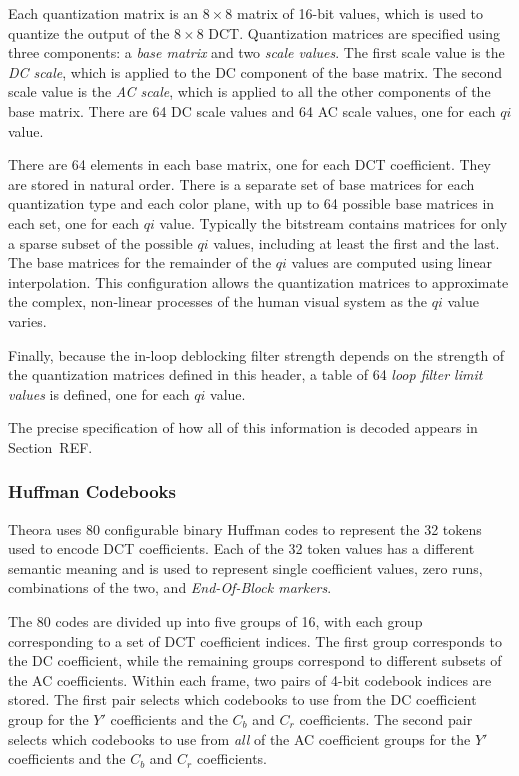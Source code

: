 \documentclass[11pt,letterpaper]{article}
\newcommand{\qi}{\ensuremath{\mathit{qi}} }
\newcommand{\term}[1]{{\em #1}}
\begin{document}
Each quantization matrix is an $8\times 8$ matrix of 16-bit values, which is
 used to quantize the output of the $8\times 8$ DCT.
Quantization matrices are specified using three components: a
 \term{base matrix} and two \term{scale values}.
The first scale value is the \term{DC scale}, which is applied to the DC
 component of the base matrix.
The second scale value is the \term{AC scale}, which is applied to all the
 other components of the base matrix.
There are 64 DC scale values and 64 AC scale values, one for each \qi value.

There are 64 elements in each base matrix, one for each DCT coefficient.
They are stored in natural order.
There is a separate set of base matrices for each quantization type and each
 color plane, with up to 64 possible base matrices in each set, one for each
 \qi value.
Typically the bitstream contains matrices for only a sparse subset of the
 possible \qi values, including at least the first and the last.
The base matrices for the remainder of the \qi values are computed using linear
 interpolation.
This configuration allows the quantization matrices to approximate the complex,
 non-linear processes of the human visual system as the \qi value varies.

Finally, because the in-loop deblocking filter strength depends on the strength
 of the quantization matrices defined in this header, a table of 64 \term{loop
 filter limit values} is defined, one for each \qi value.

The precise specification of how all of this information is decoded appears in
 Section~REF.

\subsubsection{Huffman Codebooks}

Theora uses 80 configurable binary Huffman codes to represent the 32 tokens
 used to encode DCT coefficients.
Each of the 32 token values has a different semantic meaning and is used to
 represent single coefficient values, zero runs, combinations of the two, and
 \term{End-Of-Block markers}.

The 80 codes are divided up into five groups of 16, with each group
 corresponding to a set of DCT coefficient indices.
The first group corresponds to the DC coefficient, while the remaining groups
 correspond to different subsets of the AC coefficients.
Within each frame, two pairs of 4-bit codebook indices are stored.
The first pair selects which codebooks to use from the DC coefficient group for
 the $Y'$ coefficients and the $C_b$ and $C_r$ coefficients.
The second pair selects which codebooks to use from {\em all} of the AC
 coefficient groups for the $Y'$ coefficients and the $C_b$ and $C_r$
 coefficients.
\end{document}
